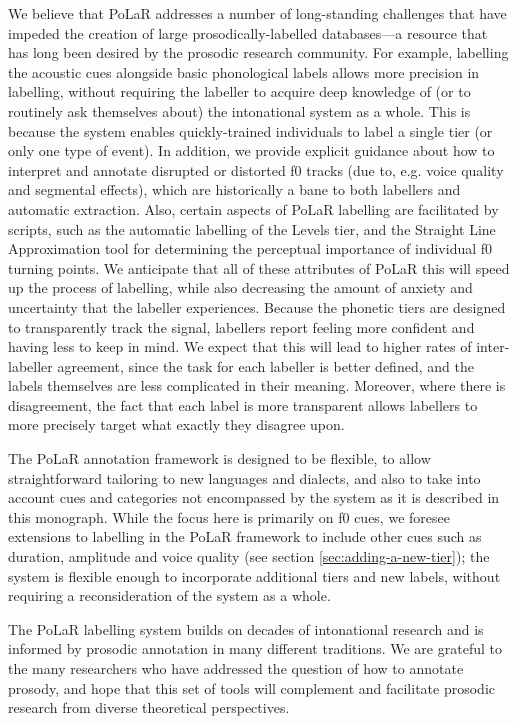 \documentclass[11pt, twoside]{memoir}
\begin{document}
We believe that PoLaR addresses a number of long-standing challenges that have impeded the creation of large prosodically-labelled databases---a resource that has long been desired by the prosodic research community.  For example, labelling the acoustic cues alongside basic phonological labels allows more precision in labelling, without requiring the labeller to acquire deep knowledge of (or to routinely ask themselves about) the intonational system as a whole. This is because the system enables quickly-trained individuals to label a single tier (or only one type of event). In addition, we provide explicit guidance about how to interpret and annotate disrupted or distorted f0 tracks (due to, e.g. voice quality and segmental effects), which are historically a bane to both labellers and automatic extraction.  Also, certain aspects of PoLaR labelling are facilitated by scripts, such as the automatic labelling of the Levels tier, and the Straight Line Approximation tool for determining the perceptual importance of individual f0 turning points. We anticipate that all of these attributes of PoLaR this will speed up the process of labelling, while also decreasing the amount of anxiety and uncertainty that the labeller experiences. Because the phonetic tiers are designed to transparently track the signal, labellers report feeling more confident and having less to keep in mind. We expect that this will lead to higher rates of inter-labeller agreement, since the task for each labeller is better defined, and the labels themselves are less complicated in their meaning. Moreover, where there is disagreement, the fact that each label is more transparent allows labellers to more precisely target what exactly they disagree upon. 

The PoLaR annotation framework is designed to be flexible, to allow straightforward tailoring to new languages and dialects, and also to take into account cues and categories not encompassed by the system as it is described in this monograph. While the focus here is primarily on f0 cues, we foresee extensions to labelling in the PoLaR framework to include other cues such as duration, amplitude and voice quality (see section \ref{sec:adding-a-new-tier}); the system is flexible enough to incorporate additional tiers and new labels, without requiring a reconsideration of the system as a whole.

The PoLaR labelling system builds on decades of intonational research and is informed by prosodic annotation in many different traditions. We are grateful to the many researchers who have addressed the question of how to annotate prosody, and hope that this set of tools will complement and facilitate prosodic research from diverse theoretical perspectives.



\end{document}
